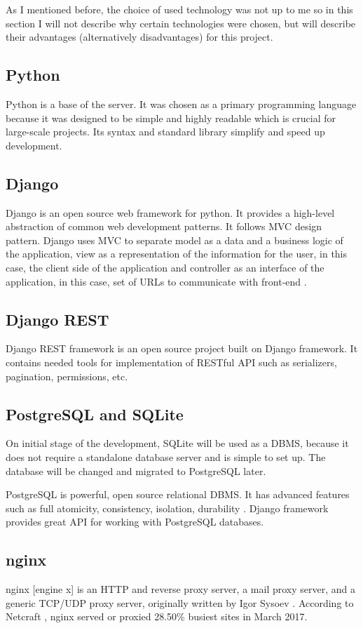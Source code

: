 As I mentioned before, the choice of used technology was not up to me so in this section I will not describe why certain technologies were chosen, but will describe their advantages (alternatively disadvantages) for this project.


\subsection{Python}
Python is a base of the server. It was chosen as a primary programming language because it was designed to be simple and highly readable which is crucial for large-scale projects. Its syntax and standard library simplify and speed up development.

\subsection{Django}
Django is an open source web framework for python. It provides a high-level abstraction of common web development patterns. It follows \ac{MVC} design pattern. Django uses \ac{MVC} to separate model as a data and a business logic of the application, view as a representation of the information for the user, in this case, the client side of the application and controller as an interface of the application, in this case, set of URLs to communicate with front-end \cite{django}.

\subsection{Django REST}
Django REST framework is an open source project built on Django framework. It contains needed tools for implementation of \ac{REST}ful \ac{API} such as serializers, pagination, permissions, etc.

\subsection{PostgreSQL and SQLite}
On initial stage of the development, SQLite will be used as a \ac{DBMS}, because it does not require a standalone database server and is simple to set up. The database will be changed and migrated to PostgreSQL later.

PostgreSQL is powerful, open source relational \ac{DBMS}. It has advanced features such as full atomicity, consistency, isolation, durability \cite{postgres}. Django framework provides great \ac{API} for working with PostgreSQL databases.

\subsection{nginx}
nginx [engine x] is an HTTP and reverse proxy server, a mail proxy server, and a generic TCP/UDP proxy server, originally written by Igor Sysoev \cite{nginx}. According to Netcraft \cite{netcraft}, nginx served or proxied 28.50\% busiest sites in March 2017.


